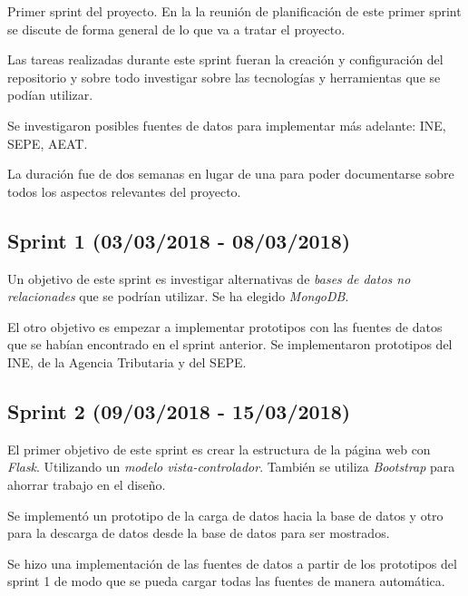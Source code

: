 Primer sprint del proyecto. En la la reunión de planificación de este primer sprint se discute de forma general de lo que va a tratar el proyecto. 

Las tareas realizadas durante este sprint fueran la creación y configuración del repositorio y sobre todo investigar sobre las tecnologías y herramientas que se podían utilizar.

Se investigaron posibles fuentes de datos para implementar más adelante: INE, SEPE, AEAT.

La duración fue de dos semanas en lugar de una para poder documentarse sobre todos los aspectos relevantes del proyecto.



\subsection{Sprint 1 (03/03/2018 - 08/03/2018)}

Un objetivo de este sprint es investigar alternativas de \textit{bases de datos no relacionades} que se podrían utilizar. Se ha elegido \textit{MongoDB}.

El otro objetivo es empezar a implementar prototipos con las fuentes de datos que se habían encontrado en el sprint anterior. Se implementaron prototipos del INE, de la Agencia Tributaria y del SEPE.



\subsection{Sprint 2 (09/03/2018 - 15/03/2018)}

El primer objetivo de este sprint es crear la estructura de la página web con \textit{Flask}. Utilizando un \textit{modelo vista-controlador}. También se utiliza \textit{Bootstrap} para ahorrar trabajo en el diseño.

Se implementó un prototipo de la carga de datos hacia la base de datos y otro para la descarga de datos desde la base de datos para ser mostrados.

Se hizo una implementación de las fuentes de datos a partir de los prototipos del sprint 1 de modo que se pueda cargar todas las fuentes de manera automática.

